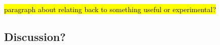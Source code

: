 \documentclass[../../AdvancementSummary.tex]{subfiles}
\begin{document}
\hl{paragraph about relating back to something useful or experimental?}



\subsection{Discussion?}

























\end{document}
